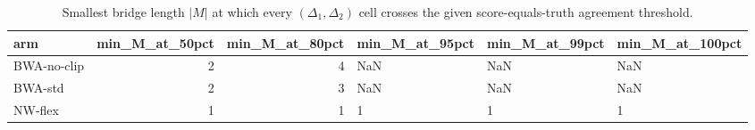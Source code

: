 \begin{table}
\caption{Smallest bridge length $|M|$ at which every $(\Delta_1, \Delta_2)$ cell crosses the given score-equals-truth agreement threshold.}
\label{tab:compound-bridge-breakpoint}
\begin{tabular}{lrrlll}
\toprule
arm & min_M_at_50pct & min_M_at_80pct & min_M_at_95pct & min_M_at_99pct & min_M_at_100pct \\
\midrule
BWA-no-clip & 2 & 4 & NaN & NaN & NaN \\
BWA-std & 2 & 3 & NaN & NaN & NaN \\
NW-flex & 1 & 1 & 1 & 1 & 1 \\
\bottomrule
\end{tabular}
\end{table}
